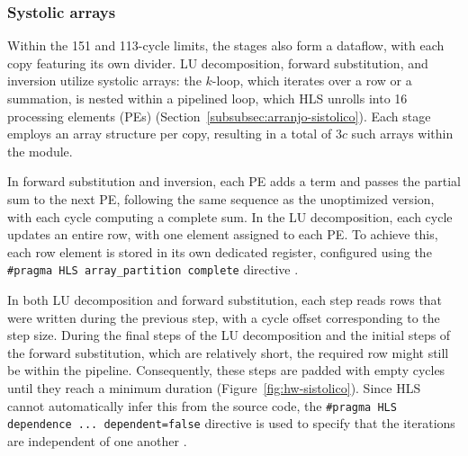 \subsubsection{\texorpdfstring{Systolic arrays}{Systolic arrays}}\label{subsubsec:hw-sistolico}

Within the 151 and 113-cycle limits, the stages also form a dataflow, with each copy featuring its own divider. LU decomposition, forward substitution, and inversion utilize systolic arrays: the $k$-loop, which iterates over a row or a summation, is nested within a pipelined loop, which HLS unrolls into 16 processing elements (PEs) (Section~\ref{subsubsec:arranjo-sistolico}). Each stage employs an array structure per copy, resulting in a total of $3c$ such arrays within the module.

In forward substitution and inversion, each PE adds a term and passes the partial sum to the next PE, following the same sequence as the unoptimized version, with each cycle computing a complete sum. In the LU decomposition, each cycle updates an entire row, with one element assigned to each PE. To achieve this, each row element is stored in its own dedicated register, configured using the \texttt{\#pragma HLS array\_partition complete} directive \cite[p.~87]{kastner-hls}.

In both LU decomposition and forward substitution, each step reads rows that were written during the previous step, with a cycle offset corresponding to the step size. During the final steps of the LU decomposition and the initial steps of the forward substitution, which are relatively short, the required row might still be within the pipeline. Consequently, these steps are padded with empty cycles until they reach a minimum duration (Figure~\ref{fig:hw-sistolico}). Since HLS cannot automatically infer this from the source code, the \texttt{\#pragma HLS dependence ... dependent=false} directive is used to specify that the iterations are independent of one another \cite[p.~149]{kastner-hls}.


